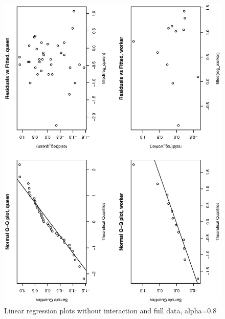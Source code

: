 \documentclass[a4paper,10pt]{article}
\begin{document}
\begin{figure}
\includegraphics[angle=-90, width=1\textwidth]{figures/math650_hw8_fig2_alpha0_8.eps}
\caption{Linear regression plots without interaction and full data, alpha=0.8}\label{f4}
\end{figure}
\end{document}
